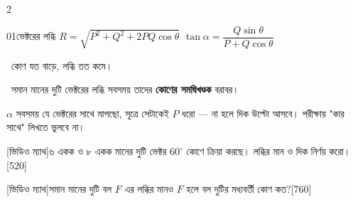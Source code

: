 \documentclass[11pt]{article}
\begin{document}
\begin{multicols}{2}
\begin{typebox}{01}{ভেক্টরের লব্ধি}
 $R=\sqrt{P^2+Q^2+2PQ\cos\theta}$
 $\tan\alpha=\dfrac{Q\sin\theta}{P+Q\cos\theta}$
\begin{roundbox}
\textbullet\ কোণ যত বাড়ে, লব্ধি তত কমে।\par
\textbullet\ সমান মানের দুটি ভেক্টরের লব্ধি সবসময় তাদের \textbf{কোণের সমদ্বিখণ্ডক} বরাবর।
\end{roundbox}
\end{typebox}

\begin{tipbox}[455]
$\alpha$ সবসময় যে ভেক্টরের সাথে মাপছো, সূত্রে সেটাকেই $P$ ধরো — না হলে দিক উল্টো আসবে। পরীক্ষায় "কার সাথে" লিখতে ভুলবে না।
\end{tipbox}

[ভিডিও ম্যাথ]{৬ একক ও ৮ একক মানের দুটি ভেক্টর $60^\circ$ কোণে ক্রিয়া করছে। লব্ধির মান ও দিক নির্ণয় করো।}[520]
\solhead
{}
{}

[ভিডিও ম্যাথ]{সমান মানের দুটি বল $F$ এর লব্ধির মানও $F$ হলে বল দুটির মধ্যবর্তী কোণ কত?}[760]
\solhead
{}
{}


\end{multicols}
\end{document}
